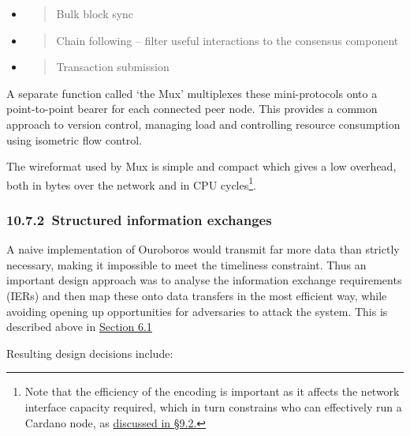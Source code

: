 \documentclass[]{article}
\begin{document}
\begin{itemize}
\item
  \begin{quote}
  Bulk block sync
  \end{quote}
\item
  \begin{quote}
  Chain following -- filter useful interactions to the consensus
  component
  \end{quote}
\item
  \begin{quote}
  Transaction submission
  \end{quote}
\end{itemize}

A separate function called `the Mux' multiplexes these mini-protocols
onto a point-to-point bearer for each connected peer node. This provides
a common approach to version control, managing load and controlling
resource consumption using isometric flow control.

The wireformat used by Mux is simple and compact which gives a low
overhead, both in bytes over the network and in CPU cycles\footnote{Note
  that the efficiency of the encoding is important as it affects the
  network interface capacity required, which in turn constrains who can
  effectively run a Cardano node, as
  \protect\hyperlink{fundamental-tradeoffs}{{discussed in §9.2.}}}.

\hypertarget{structured-information-exchanges}{%
\subsubsection{​10.7.2​~Structured information
exchanges}\label{structured-information-exchanges}}

A naive implementation of Ouroboros would transmit far more data than
strictly necessary, making it impossible to meet the timeliness
constraint. Thus an important design approach was to analyse the
information exchange requirements (IERs) and then map these onto data
transfers in the most efficient way, while avoiding opening up
opportunities for adversaries to attack the system. This is described
above in
\protect\hyperlink{consensus-constraints-and-design-decisions}{{Section
6.1}}

Resulting design decisions include:
\end{document}
